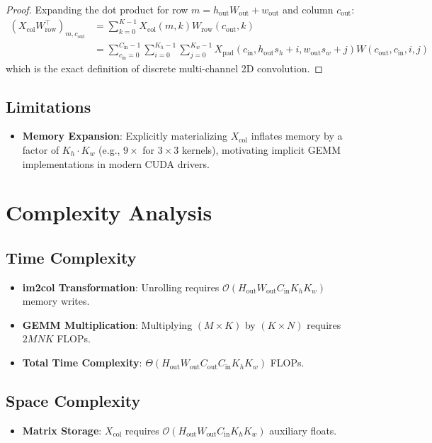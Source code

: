 \documentclass[11pt,a4paper]{article}
\theoremstyle{definition}
\begin{document}
\begin{proof}
Expanding the dot product for row $m = h_{\text{out}} W_{\text{out}} + w_{\text{out}}$ and column $c_{\text{out}}$:
\begin{align}
(X_{\text{col}} W_{\text{row}}^\top)_{m, c_{\text{out}}} &= \sum_{k=0}^{K-1} X_{\text{col}}(m, k) W_{\text{row}}(c_{\text{out}}, k) \\
&= \sum_{c_{\text{in}}=0}^{C_{\text{in}}-1} \sum_{i=0}^{K_h-1} \sum_{j=0}^{K_w-1} X_{\text{pad}}(c_{\text{in}}, h_{\text{out}} s_h + i, w_{\text{out}} s_w + j) W(c_{\text{out}}, c_{\text{in}}, i, j)
\end{align}
which is the exact definition of discrete multi-channel 2D convolution.
\end{proof}

\subsection{Limitations}
\begin{itemize}
    \item \textbf{Memory Expansion}: Explicitly materializing $X_{\text{col}}$ inflates memory by a factor of $K_h \cdot K_w$ (e.g., $9\times$ for $3 \times 3$ kernels), motivating implicit GEMM implementations in modern CUDA drivers.
\end{itemize}

\section{Complexity Analysis}

\subsection{Time Complexity}
\begin{itemize}
    \item \textbf{im2col Transformation}: Unrolling requires $\mathcal{O}(H_{\text{out}} W_{\text{out}} C_{\text{in}} K_h K_w)$ memory writes.
    \item \textbf{GEMM Multiplication}: Multiplying $(M \times K)$ by $(K \times N)$ requires $2 M N K$ FLOPs.
    \item \textbf{Total Time Complexity}: $\Theta(H_{\text{out}} W_{\text{out}} C_{\text{out}} C_{\text{in}} K_h K_w)$ FLOPs.
\end{itemize}

\subsection{Space Complexity}
\begin{itemize}
    \item \textbf{Matrix Storage}: $X_{\text{col}}$ requires $\mathcal{O}(H_{\text{out}} W_{\text{out}} C_{\text{in}} K_h K_w)$ auxiliary floats.
\end{itemize}
\end{document}
